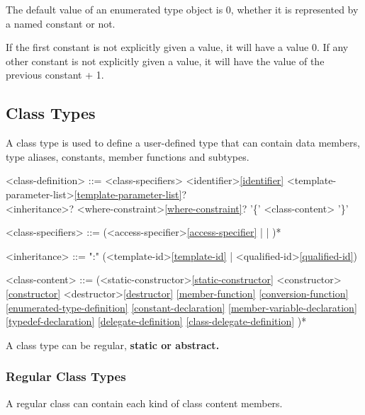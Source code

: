 \documentclass[a4paper,oneside,11pt]{article}
\begin{document}
The default value of an enumerated type object is 0, whether it is represented by a named constant or not.

If the first constant is not explicitly given a value, it will have a value 0.
If any other constant is not explicitly given a value, it will have the value of the previous constant + 1.

\subsection{Class Types}\label{sec:classtypes}

A class type is used to define a user-defined type that can contain data members, type aliases, constants, member functions and subtypes.

\begin{grammar}
\label{class-definition}<class-definition> ::= <class-specifiers>  <identifier>\ref{identifier} <template-parameter-list>\ref{template-parameter-list}?\\
<inheritance>? <where-constraint>\ref{where-constraint}? '\{' <class-content> '\}'

<class-specifiers> ::= (<access-specifier>\ref{access-specifier} |  | )*

<inheritance> ::= ":" (<template-id>\ref{template-id} | <qualified-id>\ref{qualified-id})

<class-content> ::= (<static-constructor>\ref{static-constructor}
\alt <constructor>\ref{constructor}
\alt <destructor>\ref{destructor}
\ref{member-function}
\ref{conversion-function}
\ref{enumerated-type-definition}
\ref{constant-declaration}
\ref{member-variable-declaration}
\ref{typedef-declaration}
\ref{delegate-definition}
\ref{class-delegate-definition}
)*
\end{grammar}

A class type can be regular, \bf{static} or \bf{abstract}.

\subsubsection{Regular Class Types}

A regular class can contain each kind of class content members.
\end{document}
